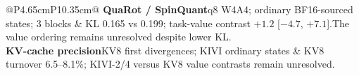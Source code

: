 \begin{table}[t]
\begin{tabular}{@{}P{4.65cm}P{10.35cm}@{}}
\addlinespace[5pt] %
\textbf{QuaRot / SpinQuant}\newline \textcolor{black!65}{q8 W4A4; ordinary BF16-sourced states; 3 blocks}
& KL 0.165 vs 0.199; task-value contrast $+1.2$ [$-4.7$, $+7.1$].\newline The value ordering remains unresolved despite lower KL. \\
\addlinespace[5pt] %
\textbf{KV-cache precision}\newline \textcolor{black!65}{KV8 first divergences; KIVI ordinary states}
& KV8 turnover 6.5--8.1\%; KIVI-2/4 versus KV8 value contrasts remain unresolved. \\
\bottomrule
\end{tabular}
\caption{Complete scope results on separate populations (Appendix~\ref{app:scope}). BFCL and ALFWorld use post hoc item-bootstrap 95\% intervals. QuaRot/SpinQuant and RTN-W3 $F$ use crossed 95\%; RTN-W3 action-only net gives fixed-pool and new-task 95\%. None of these panels supplies a Q$'$ reference: the separate W3 reference is GPTQ-W3 (Appendix~\ref{app:qprime}), rather than RTN-W3.}
\label{tab:scopefull}
\end{table}
